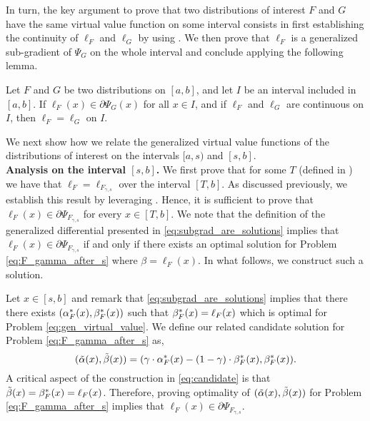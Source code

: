 

In turn, the key argument to prove that two distributions of interest $F$ and $G$ have the same virtual value function on some interval consists in first establishing the continuity of $\ell_F$ and $\ell_G$ by using . We then prove that $\ell_F$ is a generalized sub-gradient of $\Psi_G$ on the whole interval and conclude applying the following lemma.
\begin{lemma}
\label{lem:inclusion_to_eq}
Let $F$ and $G$ be two distributions on $[a,b]$, and let $I$ be an interval included in $[a,b]$. If $\ell_F(x) \in \partial \Psi_{G}(x)$ for all $x \in I$, and if $\ell_F$ and $\ell_G$ are continuous on $I$, then $\ell_F = \ell_G$ on $I$.
\end{lemma}
We next show how we relate the generalized virtual value functions of the distributions of interest on the intervals $[a,s)$ and $[s,b]$.\\

\noindent \textbf{Analysis on the interval $[s,b]$.}
We first prove that for some $T$ (defined in ) we have that $\ell_F = \ell_{F_{\gamma,s}}$ over the interval $[T,b]$. As discussed previously, we establish this result by leveraging . Hence, it is sufficient to prove that $\ell_{F}(x) \in \partial \Psi_{F_{\gamma,s}}$ for every $x \in [T,b]$. We note that the definition of the generalized differential presented in \eqref{eq:subgrad_are_solutions} implies that $\ell_{F}(x) \in \partial \Psi_{F_{\gamma,s}}$ if and only if there exists an optimal solution for Problem \eqref{eq:F_gamma_after_s} where $\beta = \ell_F(x)$. In what follows, we construct such a solution.


Let $x \in [s,b]$ and remark that \eqref{eq:subgrad_are_solutions} implies that there there exists $(\alpha^*_F(x),\beta^*_F(x))$ such that $\beta^*_F(x) = \ell_{F}(x)$ which is optimal for Problem \eqref{eq:gen_virtual_value}. We define our related candidate solution for Problem \eqref{eq:F_gamma_after_s} as,
\begin{equation}
\label{eq:candidate}
(\tilde{\alpha}(x),\tilde{\beta}(x)) = (\gamma \cdot \alpha^*_F(x) - (1-\gamma) \cdot \beta^*_F(x), \beta^*_F(x)).
\end{equation}
A critical aspect of the construction in \eqref{eq:candidate} is that $\tilde{\beta}(x) = \beta^*_F(x) = \ell_{F}(x)$. Therefore, proving optimality of $(\tilde{\alpha}(x),\tilde{\beta}(x))$ for Problem \eqref{eq:F_gamma_after_s} implies that $\ell_F(x) \in \partial \Psi_{F_{\gamma,s}}$.

